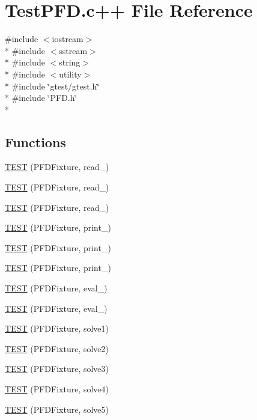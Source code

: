 \hypertarget{TestPFD_8c_09_09}{\section{Test\+P\+F\+D.\+c++ File Reference}
\label{TestPFD_8c_09_09}
}
{\ttfamily \#include $<$iostream$>$}\\*
{\ttfamily \#include $<$sstream$>$}\\*
{\ttfamily \#include $<$string$>$}\\*
{\ttfamily \#include $<$utility$>$}\\*
{\ttfamily \#include \char`\"{}gtest/gtest.\+h\char`\"{}}\\*
{\ttfamily \#include \char`\"{}P\+F\+D.\+h\char`\"{}}\\*
\subsection*{Functions}
\begin{DoxyCompactItemize}
\item 
\hyperlink{TestPFD_8c_09_09_ae2ceeb6270e4c46f9184f444c9a18803}{T\+E\+S\+T} (P\+F\+D\+Fixture, read\+\_)
\item 
\hyperlink{TestPFD_8c_09_09_a7cbb6f2592992b1e2738ac30bd9b3179}{T\+E\+S\+T} (P\+F\+D\+Fixture, read\+\_)
\item 
\hyperlink{TestPFD_8c_09_09_ad4d893008beebcf263d3cc3d02700f98}{T\+E\+S\+T} (P\+F\+D\+Fixture, read\+\_)
\item 
\hyperlink{TestPFD_8c_09_09_aeb73c70e967605680ad0fd952404723a}{T\+E\+S\+T} (P\+F\+D\+Fixture, print\+\_)
\item 
\hyperlink{TestPFD_8c_09_09_a7f9a79749e850d18f5ce2dd840bcd811}{T\+E\+S\+T} (P\+F\+D\+Fixture, print\+\_)
\item 
\hyperlink{TestPFD_8c_09_09_a9e20949b00d611069dcdcdc5d2cb7f0d}{T\+E\+S\+T} (P\+F\+D\+Fixture, print\+\_)
\item 
\hyperlink{TestPFD_8c_09_09_a19c5ff94969bb3a46858e6bf9cbe1776}{T\+E\+S\+T} (P\+F\+D\+Fixture, eval\+\_)
\item 
\hyperlink{TestPFD_8c_09_09_ab68afb0eeb95c024738a36ae7ff8fc18}{T\+E\+S\+T} (P\+F\+D\+Fixture, eval\+\_)
\item 
\hyperlink{TestPFD_8c_09_09_a306e0708d1b40dc0bb6011c54592bb4b}{T\+E\+S\+T} (P\+F\+D\+Fixture, solve1)
\item 
\hyperlink{TestPFD_8c_09_09_a59ac4582d4de7779e8b0bf613da62882}{T\+E\+S\+T} (P\+F\+D\+Fixture, solve2)
\item 
\hyperlink{TestPFD_8c_09_09_a406763214f82c55c0dcdf7bd737bfc37}{T\+E\+S\+T} (P\+F\+D\+Fixture, solve3)
\item 
\hyperlink{TestPFD_8c_09_09_aaa2c8642e29a54997f2c526af11097ad}{T\+E\+S\+T} (P\+F\+D\+Fixture, solve4)
\item 
\hyperlink{TestPFD_8c_09_09_adcd0428f697060e4ecc74f5d600969fb}{T\+E\+S\+T} (P\+F\+D\+Fixture, solve5)
\end{DoxyCompactItemize}


